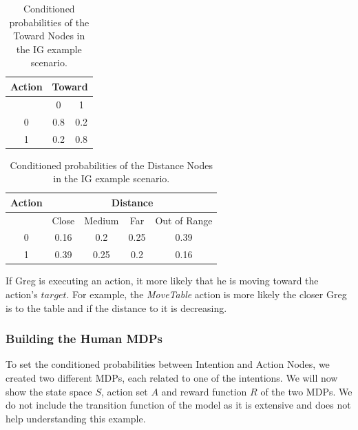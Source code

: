  \begin{table}[h!]
\centering
\begin{tabular}{|c|c|c|}
\hline
Action & \multicolumn{2}{|c|}{Toward} \\ \hline \hline
& 0 & 1 \\ \hline
0  & 0.8 & 0.2 \\ \hline
1 & 0.2 & 0.8 \\  \hline
\end{tabular}
\caption[Belief models in the IG scenario]{Conditioned probabilities of the Toward Nodes in the IG example scenario.}
 \label{table:situation_assessment-ig_toward}    
\end{table}

 \begin{table}[h!]
\centering
\begin{tabular}{|c|c|c|c|c|}
\hline
Action & \multicolumn{4}{|c|}{Distance} \\ \hline \hline
& Close & Medium & Far & Out of Range \\ \hline
0  & 0.16 & 0.2 & 0.25 & 0.39 \\ \hline
1 & 0.39 & 0.25 & 0.2 & 0.16 \\ \hline
\end{tabular}
\caption[Belief models in the IG scenario]{Conditioned probabilities of the Distance Nodes in the IG example scenario.}
 \label{table:situation_assessment-ig_distance}    
\end{table}

If Greg is executing an action, it  more likely that he is moving toward the action's $target$. For example, the \textit{MoveTable} action is more likely the closer Greg is to the table and if the distance to it is decreasing.

\subsubsection{Building the Human MDPs}

To set the conditioned probabilities between Intention and Action Nodes, we created two different MDPs, each related to one of the intentions. We will now show the state space $S$, action set $A$ and reward function $R$  of the two MDPs. We do not include the transition function of the model as it is extensive and does not help understanding this example.

